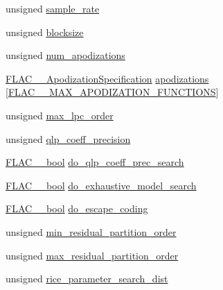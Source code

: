 \begin{DoxyCompactItemize}
\item 
unsigned \hyperlink{struct_f_l_a_c_____stream_encoder_protected_aa273a452d6e0acfb3ae21fa0348f4988}{sample\+\_\+rate}
\item 
unsigned \hyperlink{struct_f_l_a_c_____stream_encoder_protected_a0b244b1c73b4675189b8ad0b61f6fbf7}{blocksize}
\item 
unsigned \hyperlink{struct_f_l_a_c_____stream_encoder_protected_adf2b6a72c1b6ba822ffef7b0662c60d3}{num\+\_\+apodizations}
\item 
\hyperlink{struct_f_l_a_c_____apodization_specification}{F\+L\+A\+C\+\_\+\+\_\+\+Apodization\+Specification} \hyperlink{struct_f_l_a_c_____stream_encoder_protected_a6897dec9058f0cf27cf9cf9d0526be2d}{apodizations} \mbox{[}\hyperlink{src_2lib_f_l_a_c_2include_2protected_2stream__encoder_8h_ad9a5c4c2d9c054daf37639087480ad17}{F\+L\+A\+C\+\_\+\+\_\+\+M\+A\+X\+\_\+\+A\+P\+O\+D\+I\+Z\+A\+T\+I\+O\+N\+\_\+\+F\+U\+N\+C\+T\+I\+O\+NS}\mbox{]}
\item 
unsigned \hyperlink{struct_f_l_a_c_____stream_encoder_protected_a91a0efecfd54a6ccfbfbd9a868d481fb}{max\+\_\+lpc\+\_\+order}
\item 
unsigned \hyperlink{struct_f_l_a_c_____stream_encoder_protected_ac0032b9d1a6d61f3080b6b1397fabca7}{qlp\+\_\+coeff\+\_\+precision}
\item 
\hyperlink{ordinals_8h_a95103469f1cbd78b8cf250194985b34e}{F\+L\+A\+C\+\_\+\+\_\+bool} \hyperlink{struct_f_l_a_c_____stream_encoder_protected_a2541e720469457321e31ec12462311ed}{do\+\_\+qlp\+\_\+coeff\+\_\+prec\+\_\+search}
\item 
\hyperlink{ordinals_8h_a95103469f1cbd78b8cf250194985b34e}{F\+L\+A\+C\+\_\+\+\_\+bool} \hyperlink{struct_f_l_a_c_____stream_encoder_protected_a01845512401868e91d848fa1d4c1e401}{do\+\_\+exhaustive\+\_\+model\+\_\+search}
\item 
\hyperlink{ordinals_8h_a95103469f1cbd78b8cf250194985b34e}{F\+L\+A\+C\+\_\+\+\_\+bool} \hyperlink{struct_f_l_a_c_____stream_encoder_protected_a695e318795d52d27e0efcd219c981b8e}{do\+\_\+escape\+\_\+coding}
\item 
unsigned \hyperlink{struct_f_l_a_c_____stream_encoder_protected_af50dd0ed78f5580bff0c60c199ae9039}{min\+\_\+residual\+\_\+partition\+\_\+order}
\item 
unsigned \hyperlink{struct_f_l_a_c_____stream_encoder_protected_ae9a433e562e96d008c8ecc9779ea8289}{max\+\_\+residual\+\_\+partition\+\_\+order}
\item 
unsigned \hyperlink{struct_f_l_a_c_____stream_encoder_protected_aefce1a8d6a6c456b73dc82ac4f15f842}{rice\+\_\+parameter\+\_\+search\+\_\+dist}

\end{DoxyCompactItemize}
